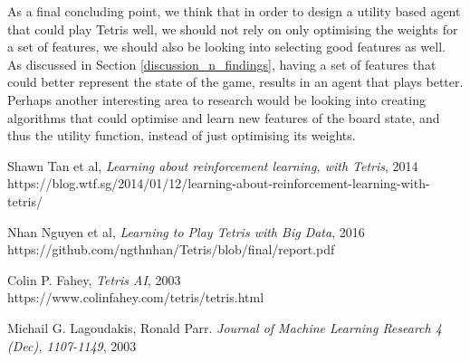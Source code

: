 \documentclass[a4paper,12pt,twocolumn]{article}
\begin{document}

As a final concluding point, we think that in order to design a utility based agent
that could play Tetris well, we should not rely on only optimising the weights
for a set of features, we should also be looking into selecting good features as well.
As discussed in Section \ref{discussion_n_findings}, having a set of features that
could better represent the state of the game, results in an agent that plays better.
Perhaps another interesting area to research would be looking into creating algorithms
that could optimise and learn new features of the board state, and thus the utility
function, instead of just optimising its weights.

\begin{thebibliography}{9}
    Shawn Tan et al, \textit{Learning about reinforcement learning, with Tetris}, 2014\\https://blog.wtf.sg/2014/01/12/learning-about-reinforcement-learning-with-tetris/

    Nhan Nguyen et al, \textit{Learning to Play Tetris with Big Data}, 2016\\https://github.com/ngthnhan/Tetris/blob/final/report.pdf

    Colin P. Fahey, \textit{Tetris AI}, 2003\\https://www.colinfahey.com/tetris/tetris.html
    
    Michail G. Lagoudakis, Ronald Parr.
    \textit{Journal of Machine Learning Research 4 (Dec), 1107-1149}, 2003
\end{thebibliography}
\end{document}
